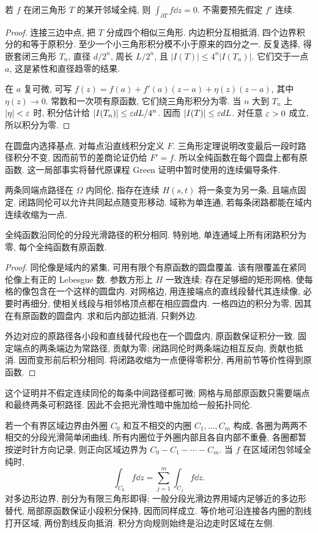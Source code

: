 \begin{theorem}[Goursat]\label{thm:goursat}
若 $f$ 在闭三角形 $T$ 的某开邻域全纯, 则 $\int_{\partial T}f\dd z=0$. 不需要预先假定 $f'$ 连续.
\end{theorem}
\begin{proof}
连接三边中点, 把 $T$ 分成四个相似三角形. 内边积分互相抵消, 四个边界积分的和等于原积分. 至少一个小三角形积分模不小于原来的四分之一. 反复选择, 得嵌套闭三角形 $T_n$, 直径 $d/2^n$, 周长 $L/2^n$, 且 $|I(T)|\le4^n|I(T_n)|$. 它们交于一点 $a$, 这是紧性和直径趋零的结果.

在 $a$ 复可微, 可写 $f(z)=f(a)+f'(a)(z-a)+\eta(z)(z-a)$, 其中 $\eta(z)\to0$. 常数和一次项有原函数, 它们绕三角形积分为零. 当 $n$ 大到 $T_n$ 上 $|\eta|<\varepsilon$ 时, 积分估计给 $|I(T_n)|\le\varepsilon dL/4^n$. 因而 $|I(T)|\le\varepsilon dL$. 对任意 $\varepsilon>0$ 成立, 所以积分为零.
\end{proof}
在圆盘内选择基点, 对每点沿直线积分定义 $F$. 三角形定理说明改变最后一段时路径积分不变, 因而前节的差商论证仍给 $F'=f$. 所以全纯函数在每个圆盘上都有原函数. 这一局部事实将替代原课程 Green 证明中暂时使用的连续偏导条件.

两条同端点路径在 $\Omega$ 内同伦, 指存在连续 $H(s,t)$ 将一条变为另一条, 且端点固定. 闭路同伦可以允许共同起点随变形移动. 域称为单连通, 若每条闭路都能在域内连续收缩为一点.
\begin{theorem}\label{thm:homotopy}
全纯函数沿同伦的分段光滑路径的积分相同. 特别地, 单连通域上所有闭路积分为零, 每个全纯函数有原函数.
\end{theorem}
\begin{proof}
同伦像是域内的紧集, 可用有限个有原函数的圆盘覆盖. 该有限覆盖在紧同伦像上有正的 Lebesgue 数. 参数方形上 $H$ 一致连续; 存在足够细的矩形网格, 使每格的像包含在一个这样的圆盘内. 对网格边, 用连接端点的直线段替代其连续像, 必要时再细分, 使相关线段与相邻格顶点都在相应圆盘内. 一格四边的积分为零, 因其在有原函数的圆盘内. 求和后内部边抵消, 只剩外边.

外边对应的原路径各小段和直线替代段也在一个圆盘内, 原函数保证积分一致. 固定端点的两条端边为常路径, 贡献为零; 闭路同伦时两条端边相互反向, 贡献也抵消. 因而变形前后积分相同. 将闭路收缩为一点便得零积分, 再用前节等价性得到原函数.
\end{proof}
这个证明并不假定连续同伦的每条中间路径都可微; 网格与局部原函数只需要端点和最终两条可积路径. 因此不会把光滑性暗中施加给一般拓扑同伦.

若一个有界区域边界由外圈 $C_0$ 和互不相交的内圈 $C_1,\ldots,C_m$ 构成, 各圈为两两不相交的分段光滑简单闭曲线, 所有内圈位于外圈内部且各自内部不重叠, 各圈都暂按逆时针方向记录, 则正向区域边界为 $C_0-C_1-\cdots-C_m$. 当 $f$ 在区域闭包邻域全纯时,
\[
\int_{C_0}f\dd z=\sum_{j=1}^m\int_{C_j}f\dd z.
\]
对多边形边界, 剖分为有限三角形即得; 一般分段光滑边界用域内足够近的多边形替代, 局部原函数保证小段积分保持, 因而同样成立. 等价地可沿连接各内圈的割线打开区域, 两份割线反向抵消. 积分方向规则始终是沿边走时区域在左侧.

